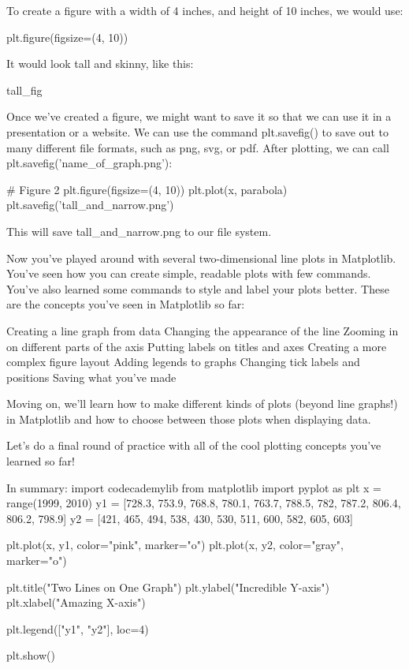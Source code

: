 \documentclass{journal}
\begin{document}
To create a figure with a width of 4 inches, and height of 10 inches, we would use:

plt.figure(figsize=(4, 10))

It would look tall and skinny, like this:

tall_fig

Once we’ve created a figure, we might want to save it so that we can use it in a presentation or a website. We can use the command plt.savefig() to save out to many different file formats, such as png, svg, or pdf. After plotting, we can call plt.savefig('name_of_graph.png'):

# Figure 2
plt.figure(figsize=(4, 10)) 
plt.plot(x, parabola)
plt.savefig('tall_and_narrow.png')

This will save tall_and_narrow.png to our file system.


Now you’ve played around with several two-dimensional line plots in Matplotlib. You’ve seen how you can create simple, readable plots with few commands. You’ve also learned some commands to style and label your plots better. These are the concepts you’ve seen in Matplotlib so far:

    Creating a line graph from data
    Changing the appearance of the line
    Zooming in on different parts of the axis
    Putting labels on titles and axes
    Creating a more complex figure layout
    Adding legends to graphs
    Changing tick labels and positions
    Saving what you’ve made

Moving on, we’ll learn how to make different kinds of plots (beyond line graphs!) in Matplotlib and how to choose between those plots when displaying data.

Let’s do a final round of practice with all of the cool plotting concepts you’ve learned so far!

In summary:
import codecademylib
from matplotlib import pyplot as plt
x = range(1999, 2010)
y1 = [728.3, 753.9, 768.8, 780.1, 763.7, 788.5, 782, 787.2, 806.4, 806.2, 798.9]
y2 = [421, 465, 494, 538, 430, 530, 511, 600, 582, 605, 603]

plt.plot(x, y1, color="pink", marker="o")
plt.plot(x, y2, color="gray", marker="o")

plt.title("Two Lines on One Graph")
plt.ylabel("Incredible Y-axis")
plt.xlabel("Amazing X-axis")

plt.legend(["y1", "y2"], loc=4)

plt.show()
\end{document}
